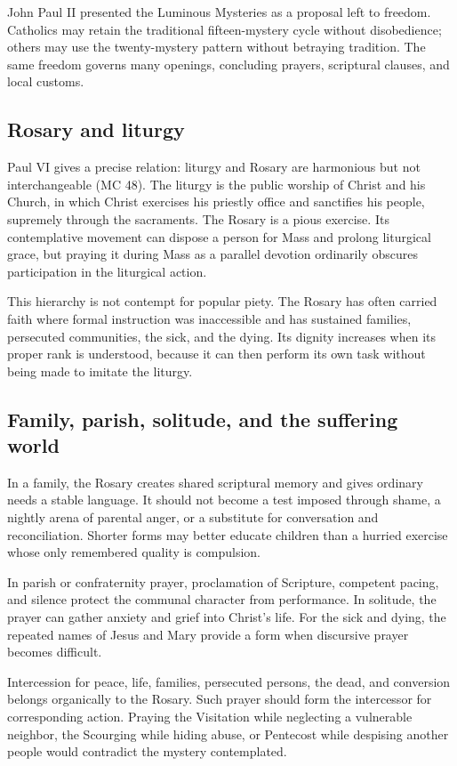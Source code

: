 John Paul II presented the Luminous Mysteries as a proposal left to freedom. Catholics may retain the traditional fifteen-mystery cycle without disobedience; others may use the twenty-mystery pattern without betraying tradition. The same freedom governs many openings, concluding prayers, scriptural clauses, and local customs.

\subsection{Rosary and liturgy}

Paul VI gives a precise relation: liturgy and Rosary are harmonious but not interchangeable (MC 48). The liturgy is the public worship of Christ and his Church, in which Christ exercises his priestly office and sanctifies his people, supremely through the sacraments. The Rosary is a pious exercise. Its contemplative movement can dispose a person for Mass and prolong liturgical grace, but praying it during Mass as a parallel devotion ordinarily obscures participation in the liturgical action.

This hierarchy is not contempt for popular piety. The Rosary has often carried faith where formal instruction was inaccessible and has sustained families, persecuted communities, the sick, and the dying. Its dignity increases when its proper rank is understood, because it can then perform its own task without being made to imitate the liturgy.

\subsection{Family, parish, solitude, and the suffering world}

In a family, the Rosary creates shared scriptural memory and gives ordinary needs a stable language. It should not become a test imposed through shame, a nightly arena of parental anger, or a substitute for conversation and reconciliation. Shorter forms may better educate children than a hurried exercise whose only remembered quality is compulsion.

In parish or confraternity prayer, proclamation of Scripture, competent pacing, and silence protect the communal character from performance. In solitude, the prayer can gather anxiety and grief into Christ's life. For the sick and dying, the repeated names of Jesus and Mary provide a form when discursive prayer becomes difficult.

Intercession for peace, life, families, persecuted persons, the dead, and conversion belongs organically to the Rosary. Such prayer should form the intercessor for corresponding action. Praying the Visitation while neglecting a vulnerable neighbor, the Scourging while hiding abuse, or Pentecost while despising another people would contradict the mystery contemplated.

